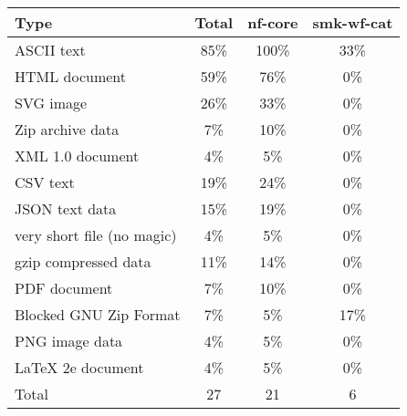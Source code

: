 \begin{tabular}{p{1.7in}ccc}
    Type & Total & nf-core & smk-wf-cat \\
    \midrule
    ASCII text & 85\% & 100\% & 33\% \\
    HTML document & 59\% & 76\% & 0\% \\
    SVG image & 26\% & 33\% & 0\% \\
    Zip archive data & 7\% & 10\% & 0\% \\
    XML 1.0 document & 4\% & 5\% & 0\% \\
    CSV text & 19\% & 24\% & 0\% \\
    JSON text data & 15\% & 19\% & 0\% \\
    very short file (no magic) & 4\% & 5\% & 0\% \\
    gzip compressed data & 11\% & 14\% & 0\% \\
    PDF document & 7\% & 10\% & 0\% \\
    Blocked GNU Zip Format & 7\% & 5\% & 17\% \\
    PNG image data & 4\% & 5\% & 0\% \\
    LaTeX 2e document & 4\% & 5\% & 0\% \\
    \midrule
    Total & 27 & 21 & 6
\end{tabular}